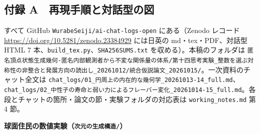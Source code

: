 \documentclass[
  a4paper,
]{ltjsarticle}
\begin{document}
\subsection{付録
A　再現手順と対話型の図}\label{ux4ed8ux9332-a-ux518dux73feux624bux9806ux3068ux5bfeux8a71ux578bux306eux56f3}

すべて GitHub \texttt{WurabeSeiji/\allowbreak{}ai-chat-logs-open} にある（Zenodo
レコード \url{https://doi.org/10.5281/zenodo.23384929} には日英の
md・tex・PDF、対話型 HTML 7
本、\texttt{build\_\allowbreak{}tex.py}、\texttt{SHA256SUMS.txt}
を収める）。本稿のフォルダは
\texttt{匿名頂点状態生成幾何-匿名内部観測者から不変な関係量の体系/\allowbreak{}第十四思考実験\_\allowbreak{}整数を選ぶ対称性の非整合と発展方向の読出し\_\allowbreak{}20261012/\allowbreak{}統合仮説論文\_\allowbreak{}20261015/\allowbreak{}}。一次資料のチャット全文は
\texttt{chat\_\allowbreak{}logs/\allowbreak{}01\_\allowbreak{}円周上の内在的な幾何学\_\allowbreak{}20261013-14\_\allowbreak{}full.md}、\texttt{chat\_\allowbreak{}logs/\allowbreak{}02\_\allowbreak{}中性子の寿命と弱い力によるフレーバー変化\_\allowbreak{}20261014-15\_\allowbreak{}full.md}。各段とチャットの箇所・論文の節・実験フォルダの対応表は
\texttt{working\_\allowbreak{}notes.md} 第 4 節。

\textbf{球面住民の数値実験（\texttt{次元の生成構造/\allowbreak{}}）}
\end{document}
